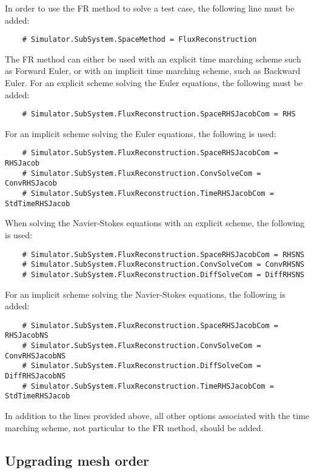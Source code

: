 \documentclass[11pt]{article}
\begin{document}
In order to use the FR method to solve a test case, the following line must be added:
\begin{verbatim}
    # Simulator.SubSystem.SpaceMethod = FluxReconstruction
\end{verbatim}
The FR method can either be used with an explicit time marching scheme such as Forward Euler, or with an implicit time marching scheme, such as Backward Euler. For an explicit scheme solving the Euler equations, the following must be added:
\begin{verbatim}
    # Simulator.SubSystem.FluxReconstruction.SpaceRHSJacobCom = RHS
\end{verbatim}
For an implicit scheme solving the Euler equations, the following is used:
\begin{verbatim}
    # Simulator.SubSystem.FluxReconstruction.SpaceRHSJacobCom = RHSJacob
    # Simulator.SubSystem.FluxReconstruction.ConvSolveCom = ConvRHSJacob
    # Simulator.SubSystem.FluxReconstruction.TimeRHSJacobCom = StdTimeRHSJacob
\end{verbatim}
When solving the Navier-Stokes equations with an explicit scheme, the following is used:
\begin{verbatim}
    # Simulator.SubSystem.FluxReconstruction.SpaceRHSJacobCom = RHSNS
    # Simulator.SubSystem.FluxReconstruction.ConvSolveCom = ConvRHSNS
    # Simulator.SubSystem.FluxReconstruction.DiffSolveCom = DiffRHSNS
\end{verbatim}
For an implicit scheme solving the Navier-Stokes equations, the following is added:
\begin{verbatim}
    # Simulator.SubSystem.FluxReconstruction.SpaceRHSJacobCom = RHSJacobNS
    # Simulator.SubSystem.FluxReconstruction.ConvSolveCom = ConvRHSJacobNS
    # Simulator.SubSystem.FluxReconstruction.DiffSolveCom = DiffRHSJacobNS
    # Simulator.SubSystem.FluxReconstruction.TimeRHSJacobCom = StdTimeRHSJacob
\end{verbatim}
In addition to the lines provided above, all other options associated with the time marching scheme, not particular to the FR method, should be added.

\subsection{Upgrading mesh order}
\end{document}
